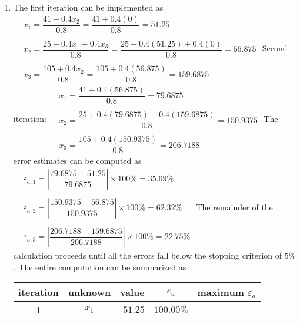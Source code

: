 \documentclass[../main.tex]{subfiles}
\begin{document}
\chapter{}
\label{cha:cha_11}


\section{}
\begin{enumerate}[label=\bfseries(\alph*)]
\item The first iteration can be implemented as
\bigbreak$
\begin{aligned}
&x_{1}=\dfrac{41+0.4 x_{2}}{0.8}=\dfrac{41+0.4(0)}{0.8}=51.25 \\\\
&x_{2}=\dfrac{25+0.4 x_{1}+0.4 x_{3}}{0.8}=\dfrac{25+0.4(51.25)+0.4(0)}{0.8}=56.875 \\\\
&x_{3}=\dfrac{105+0.4 x_{2}}{0.8}=\dfrac{105+0.4(56.875)}{0.8}=159.6875
\end{aligned}$
\bigbreak
Second iteration:
\bigbreak$
\begin{aligned}
&x_{1}=\dfrac{41+0.4(56.875)}{0.8}=79.6875 \\\\
&x_{2}=\dfrac{25+0.4(79.6875)+0.4(159.6875)}{0.8}=150.9375 \\\\
&x_{3}=\dfrac{105+0.4(150.9375)}{0.8}=206.7188
\end{aligned}$
\bigbreak
The error estimates can be computed as
\bigbreak$
\begin{aligned}
&\varepsilon_{a, 1}=\left|\dfrac{79.6875-51.25}{79.6875}\right| \times 100 \%=35.69 \% \\\\
&\varepsilon_{a, 2}=\left|\dfrac{150.9375-56.875}{150.9375}\right| \times 100 \%=62.32 \% \\\\
&\varepsilon_{a, 3}=\left|\dfrac{206.7188-159.6875}{206.7188}\right| \times 100 \%=22.75 \%
\end{aligned}$
\bigbreak
The remainder of the calculation proceeds until all the errors fall below the stopping criterion of $5 \%$. \smallbreak The entire computation can be summarized as
\bigbreak
\begin{tabular}{ccrrr}
\Xhline{1.5pt}
iteration & unknown & \multicolumn{1}{c}{value} & \multicolumn{1}{c}{$\varepsilon_{a}$} & maximum $\varepsilon_{a}$ \\
\hline
1 & $x_{1}$ & $51.25$ & $100.00 \%$ &  \\

\end{tabular}
\end{enumerate}
\end{document}
